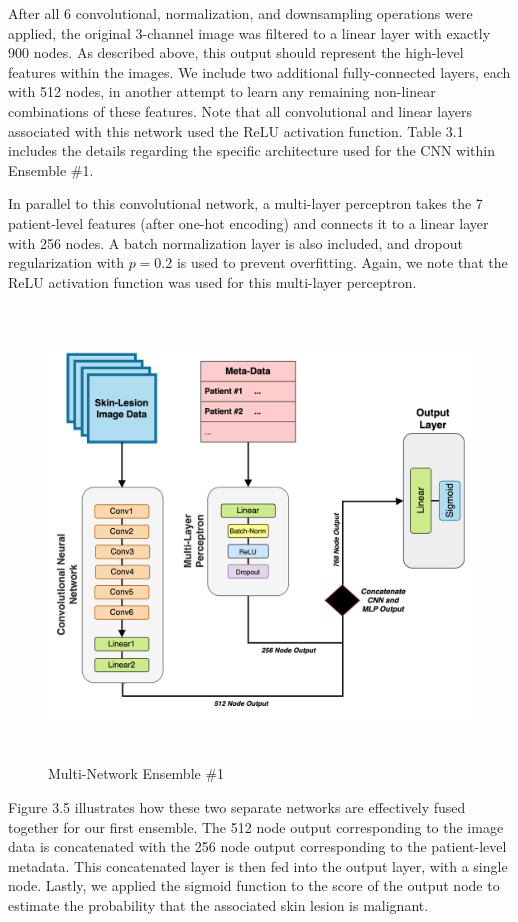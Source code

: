 \documentclass [MAS] {uclathes}
\begin{document}
After all 6 convolutional, normalization, and downsampling operations were applied, the original 3-channel image was filtered to a linear layer with exactly 900 nodes. As described above, this output should represent the high-level features within the images. We include two additional fully-connected layers, each with 512 nodes, in another attempt to learn any remaining non-linear combinations of these features. Note that all convolutional and linear layers associated with this network used the ReLU activation function. Table 3.1 includes the details regarding the specific architecture used for the CNN within Ensemble \#1.

In parallel to this convolutional network, a multi-layer perceptron takes the 7 patient-level features (after one-hot encoding) and connects it to a linear layer with 256 nodes. A batch normalization layer is also included, and dropout regularization with $p=0.2$ is used to prevent overfitting. Again, we note that the ReLU activation function was used for this multi-layer perceptron. 

\begin{figure}[h]
\centering
\includegraphics[height = 120mm, width= 140mm]{imgs/ens1_arch.png}
\caption{Multi-Network Ensemble \#1}
\label{fig:ens1_arch}
\end{figure}

Figure 3.5 illustrates how these two separate networks are effectively fused together for our first ensemble. The 512 node output corresponding to the image data is concatenated with the 256 node output corresponding to the patient-level metadata. This concatenated layer is then fed into the output layer, with a single node. Lastly, we applied the sigmoid function to the score of the output node to estimate the probability that the associated skin lesion is malignant. 
\end{document}

